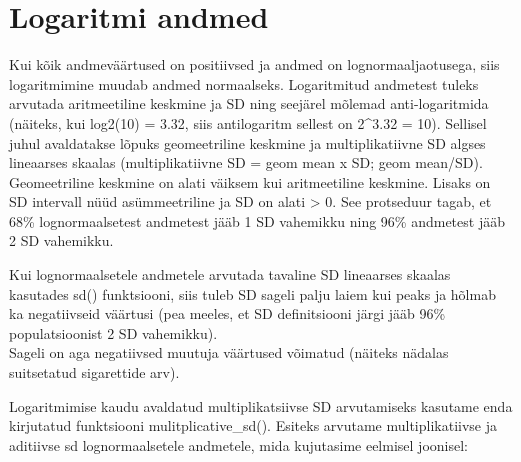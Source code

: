 \documentclass[]{book}
\begin{document}
\hypertarget{logaritmi-andmed}{%
\section*{Logaritmi andmed}\label{logaritmi-andmed}}

Kui kõik andmeväärtused on positiivsed ja andmed on lognormaaljaotusega, siis logaritmimine muudab andmed normaalseks. Logaritmitud andmetest tuleks arvutada aritmeetiline keskmine ja SD ning seejärel mõlemad anti-logaritmida (näiteks, kui log2(10) = 3.32, siis antilogaritm sellest on 2\^{}3.32 = 10). Sellisel juhul avaldatakse lõpuks geomeetriline keskmine ja multiplikatiivne SD algses lineaarses skaalas (multiplikatiivne SD = geom mean x SD; geom mean/SD). Geomeetriline keskmine on alati väiksem kui aritmeetiline keskmine. Lisaks on SD intervall nüüd asümmeetriline ja SD on alati \textgreater{} 0. See protseduur tagab, et 68\% lognormaalsetest andmetest jääb 1 SD vahemikku ning 96\% andmetest jääb 2 SD vahemikku.

Kui lognormaalsetele andmetele arvutada tavaline SD lineaarses skaalas kasutades sd() funktsiooni, siis tuleb SD sageli palju laiem kui peaks ja hõlmab ka negatiivseid väärtusi (pea meeles, et SD definitsiooni järgi jääb 96\% populatsioonist 2 SD vahemikku).\\
Sageli on aga negatiivsed muutuja väärtused võimatud (näiteks nädalas suitsetatud sigarettide arv).

Logaritmimise kaudu avaldatud multiplikatsiivse SD arvutamiseks kasutame enda kirjutatud funktsiooni mulitplicative\_sd(). Esiteks arvutame multiplikatiivse ja aditiivse sd lognormaalsetele andmetele, mida kujutasime eelmisel joonisel:
\end{document}
